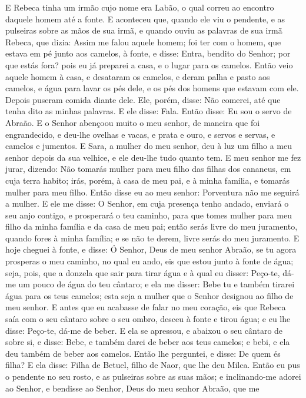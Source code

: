 E Rebeca tinha um irmão cujo nome era Labão, o qual correu ao
encontro daquele homem até a fonte. E aconteceu que, quando
ele viu o pendente, e as pulseiras sobre as mãos de sua irmã, e
quando ouviu as palavras de sua irmã Rebeca, que dizia: Assim me
falou aquele homem; foi ter com o homem, que estava em pé junto aos
camelos, à fonte, e disse: Entra, bendito do Senhor; por que
estás fora? pois eu já preparei a casa, e o lugar para os camelos.
Então veio aquele homem à casa, e desataram os camelos, e
deram palha e pasto aos camelos, e água para lavar os pés dele, e os
pés dos homens que estavam com ele. Depois puseram comida
diante dele. Ele, porém, disse: Não comerei, até que tenha dito as
minhas palavras. E ele disse: Fala. Então disse: Eu sou o
servo de Abraão. E o Senhor abençoou muito o meu senhor, de
maneira que foi engrandecido, e deu-lhe ovelhas e vacas, e prata e
ouro, e servos e servas, e camelos e jumentos. E Sara, a
mulher do meu senhor, deu à luz um filho a meu senhor depois da sua
velhice, e ele deu-lhe tudo quanto tem. E meu senhor me fez
jurar, dizendo: Não tomarás mulher para meu filho das filhas dos
cananeus, em cuja terra habito; irás, porém, à casa de meu
pai, e à minha família, e tomarás mulher para meu filho.
Então disse eu ao meu senhor: Porventura não me seguirá a
mulher. E ele me disse: O Senhor, em cuja presença tenho
andado, enviará o seu anjo contigo, e prosperará o teu caminho, para
que tomes mulher para meu filho da minha família e da casa de meu
pai; então serás livre do meu juramento, quando fores à minha
família; e se não te derem, livre serás do meu juramento. E
hoje cheguei à fonte, e disse: Ó Senhor, Deus de meu senhor Abraão,
se tu agora prosperas o meu caminho, no qual eu ando, eis que
estou junto à fonte de água; seja, pois, que a donzela que sair para
tirar água e à qual eu disser: Peço-te, dá-me um pouco de água do
teu cântaro; e ela me disser: Bebe tu e também tirarei água
para os teus camelos; esta seja a mulher que o Senhor designou ao
filho de meu senhor. E antes que eu acabasse de falar no meu
coração, eis que Rebeca saía com o seu cântaro sobre o seu ombro,
desceu à fonte e tirou água; e eu lhe disse: Peço-te, dá-me de
beber. E ela se apressou, e abaixou o seu cântaro de sobre
si, e disse: Bebe, e também darei de beber aos teus camelos; e bebi,
e ela deu também de beber aos camelos. Então lhe perguntei, e
disse: De quem és filha? E ela disse: Filha de Betuel, filho de
Naor, que lhe deu Milca. Então eu pus o pendente no seu rosto, e as
pulseiras sobre as suas mãos; e inclinando-me adorei ao
Senhor, e bendisse ao Senhor, Deus do meu senhor Abraão, que me
